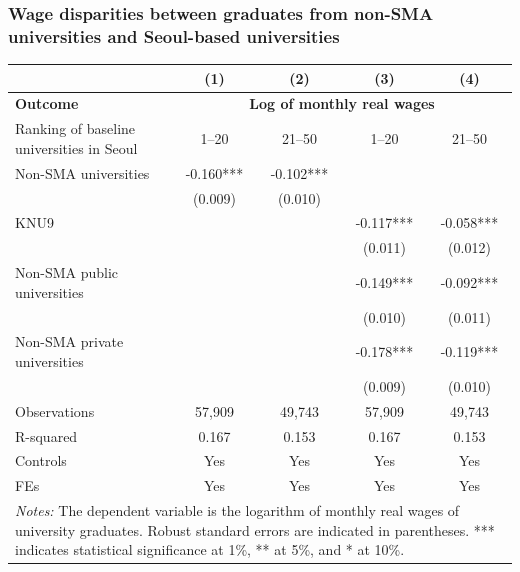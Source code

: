 \documentclass[aspectratio=169,xcolor=dvipsnames,handout]{beamer}
\begin{document}
\begin{frame}
    \frametitle{Wage disparities between graduates from non-SMA universities and Seoul-based universities}
    \begin{table}[ht]
        \centering
        \tiny
        \begin{tabular}{lcccc}
        \toprule
                                                   & \textbf{(1)} & \textbf{(2)} & \textbf{(3)} & \textbf{(4)} \\
        \midrule
        \textbf{Outcome}                           & \multicolumn{4}{c}{\textbf{Log of monthly real wages}} \\
        \midrule
         Ranking of baseline universities in Seoul & 1--20     & 21--50    & 1--20     & 21--50    \\
        \midrule
        Non-SMA universities                       & -0.160*** & -0.102*** &           &           \\
                                                   & (0.009)   & (0.010)   &           &           \\
        KNU9                                       &           &           & -0.117*** & -0.058*** \\
                                                   &           &           & (0.011)   & (0.012)   \\
        Non-SMA public universities                &           &           & -0.149*** & -0.092*** \\
                                                   &           &           & (0.010)   & (0.011)   \\
        Non-SMA private universities               &           &           & -0.178*** & -0.119*** \\
                                                   &           &           & (0.009)   & (0.010)   \\
        \midrule                                    
        Observations                               & 57,909    & 49,743    & 57,909    & 49,743    \\
        R-squared                                  & 0.167     & 0.153     & 0.167     & 0.153     \\
        Controls                                   & Yes       & Yes       & Yes       & Yes       \\
        FEs                                        & Yes       & Yes       & Yes       & Yes       \\
        \bottomrule
        \multicolumn{5}{p{9cm}}{\tiny\textit{Notes:} The dependent variable is the logarithm of monthly real wages of university graduates\@. Robust standard errors are indicated in parentheses. *** indicates statistical significance at 1\%, ** at 5\%, and * at 10\%.} \\
        \end{tabular}
    \end{table}
\end{frame}
\end{document}
